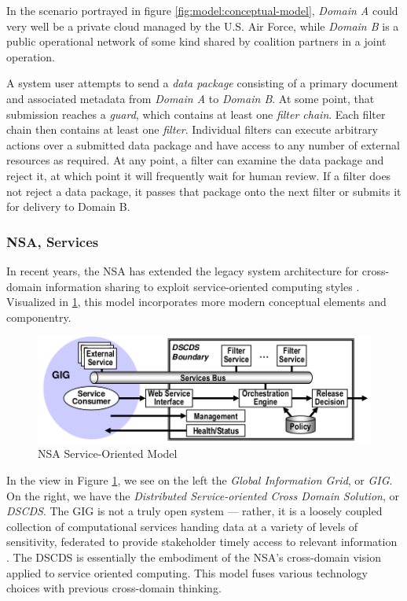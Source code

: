 \documentclass[12pt,letterpaper]{article}
\begin{document}
In the scenario portrayed in figure \ref{fig:model:conceptual-model}, \textit{Domain A} could very well be a private cloud managed by the U.S. Air Force, while \textit{Domain B} is a public operational network of some kind shared by coalition partners in a joint operation.

A system user attempts to send a \textit{data package} consisting of a primary document and associated metadata from \textit{Domain A} to \textit{Domain B}.  At some point, that submission reaches a \textit{guard}, which contains at least one \textit{filter chain}.  Each filter chain then contains at least one \textit{filter}.  Individual filters can execute arbitrary actions over a submitted data package and have access to any number of external resources as required.  At any point, a filter can examine the data package and reject it, at which point it will frequently wait for human review.  If a filter does not reject a data package, it passes that package onto the next filter or submits it for delivery to Domain B.

\subsubsection{NSA, Services}
In recent years, the NSA has extended the legacy system architecture for cross-domain information sharing to exploit service-oriented computing styles \cite{proposal:nsa-arch}.  Visualized in \ref{fig:model:conceptual-model-services}, this model incorporates more modern conceptual elements and componentry.

\begin{figure}[!t]
\centering
\includegraphics[width=5in]{nsa-arch}
\caption{NSA Service-Oriented Model}
\label{fig:model:conceptual-model-services}
\end{figure}

In the view in Figure \ref{fig:model:conceptual-model-services}, we see on the left the \textit{Global Information Grid}, or \textit{GIG}.  On the right, we have the \textit{Distributed Service-oriented Cross Domain Solution}, or \textit{DSCDS}.  The GIG is not a truly open system --- rather, it is a loosely coupled collection of computational services handing data at a variety of levels of sensitivity, federated to provide stakeholder timely access to relevant information \cite{proposal:gig-arch}.  The DSCDS is essentially the embodiment of the NSA's cross-domain vision applied to service oriented computing.  This model fuses various technology choices with previous cross-domain thinking.
\end{document}
